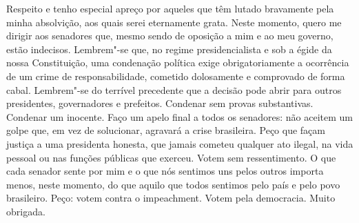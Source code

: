 Respeito e tenho especial apreço por aqueles que têm lutado bravamente
pela minha absolvição, aos quais serei eternamente grata. Neste momento,
quero me dirigir aos senadores que, mesmo sendo de oposição a mim e ao
meu governo, estão indecisos. Lembrem"-se que, no regime presidencialista
e sob a égide da nossa Constituição, uma condenação política exige
obrigatoriamente a ocorrência de um crime de responsabilidade, cometido
dolosamente e comprovado de forma cabal. Lembrem"-se do terrível
precedente que a decisão pode abrir para outros presidentes,
governadores e prefeitos. Condenar sem provas substantivas. Condenar um
inocente. Faço um apelo final a todos os senadores: não aceitem um golpe
que, em vez de solucionar, agravará a crise brasileira. Peço que façam
justiça a uma presidenta honesta, que jamais cometeu qualquer ato
ilegal, na vida pessoal ou nas funções públicas que exerceu. Votem sem
ressentimento. O que cada senador sente por mim e o que nós sentimos uns
pelos outros importa menos, neste momento, do que aquilo que todos
sentimos pelo país e pelo povo brasileiro. Peço: votem contra o
impeachment. Votem pela democracia. Muito obrigada.

